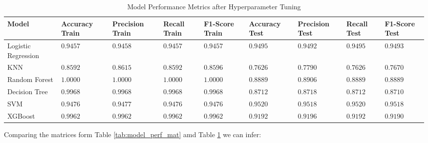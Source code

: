 \documentclass[12pt]{report}
\begin{document}
\begin{table}[H]
    \centering
    \begin{tabular}{p{2.5cm}p{1.5cm}p{1.5cm}p{1.5cm}p{1.5cm}p{1.5cm}p{1.5cm}p{1cm}p{1cm}}
    \toprule
    \textbf{Model} & \textbf{Accuracy Train} & \textbf{Precision Train} & \textbf{Recall Train} & \textbf{F1-Score Train} & \textbf{Accuracy Test} & \textbf{Precision Test} & \textbf{Recall Test} & \textbf{F1-Score Test} \\
    \toprule
    Logistic Regression & $0.9457$ & $0.9458$ & $0.9457$ & $0.9457$ & $0.9495$ & $0.9492$ & $0.9495$ & $0.9493$ \\
    \midrule
    KNN & $0.8592$ & $0.8615$ & $0.8592$ & $0.8596$ & $0.7626$ & $0.7790$ & $0.7626$ & $0.7670$ \\
    \midrule
    Random Forest & $1.0000$ & $1.0000$ & $1.0000$ & $1.0000$ & $0.8889$ & $0.8906$ & $0.8889$ & $0.8889$ \\
    \midrule
    Decision Tree & $0.9968$ & $0.9968$ & $0.9968$ & $0.9968$ & $0.8712$ & $0.8718$ & $0.8712$ & $0.8710$ \\
    \midrule
    SVM & $0.9476$ & $0.9477$ & $0.9476$ & $0.9476$ & $0.9520$ & $0.9518$ & $0.9520$ & $0.9518$ \\
    \midrule
    XGBoost & $0.9962$ & $0.9962$ & $0.9962$ & $0.9962$ & $0.9192$ & $0.9196$ & $0.9192$ & $0.9190$ \\
    \toprule
    \end{tabular}
    \caption{Model Performance Metrics after Hyperparameter Tuning}
		\label{tab:tuned_per_mat}
\end{table}

Comparing the matrices form Table \ref{tab:model_perf_mat} amd Table \ref{tab:tuned_per_mat} we can infer:
\end{document}

